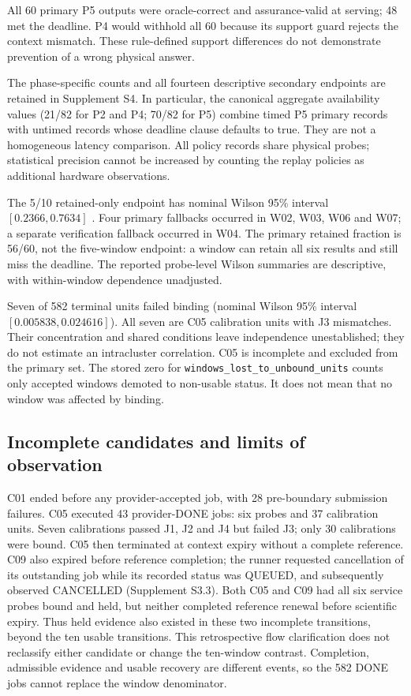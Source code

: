 \documentclass[pdflatex,sn-mathphys-num]{sn-jnl}
\newcommand{\code}[1]{\texttt{\small #1}}
\begin{document}
All 60 primary P5 outputs were oracle-correct and assurance-valid at serving; 48 met the deadline. P4 would withhold all 60 because its support guard rejects the context mismatch. These rule-defined support differences do not demonstrate prevention of a wrong physical answer.

The phase-specific counts and all fourteen descriptive secondary endpoints are retained in Supplement S4. In particular, the canonical aggregate availability values (21/82 for P2 and P4; 70/82 for P5) combine timed P5 primary records with untimed records whose deadline clause defaults to true. They are not a homogeneous latency comparison. All policy records share physical probes; statistical precision cannot be increased by counting the replay policies as additional hardware observations.

The 5/10 retained-only endpoint has nominal Wilson 95\% interval $[0.2366,0.7634]$ \cite{wilson1927}. Four primary fallbacks occurred in W02, W03, W06 and W07; a separate verification fallback occurred in W04. The primary retained fraction is 56/60, not the five-window endpoint: a window can retain all six results and still miss the deadline. The reported probe-level Wilson summaries are descriptive, with within-window dependence unadjusted.

Seven of 582 terminal units failed binding (nominal Wilson 95\% interval $[0.005838,0.024616]$). All seven are C05 calibration units with J3 mismatches. Their concentration and shared conditions leave independence unestablished; they do not estimate an intracluster correlation. C05 is incomplete and excluded from the primary set. The stored zero for \code{windows\_lost\_to\_unbound\_units} counts only accepted windows demoted to non-usable status. It does not mean that no window was affected by binding.

\subsection{Incomplete candidates and limits of observation}
C01 ended before any provider-accepted job, with 28 pre-boundary submission failures. C05 executed 43 provider-DONE jobs: six probes and 37 calibration units. Seven calibrations passed J1, J2 and J4 but failed J3; only 30 calibrations were bound. C05 then terminated at context expiry without a complete reference. C09 also expired before reference completion; the runner requested cancellation of its outstanding job while its recorded status was QUEUED, and subsequently observed CANCELLED (Supplement S3.3). Both C05 and C09 had all six service probes bound and held, but neither completed reference renewal before scientific expiry. Thus held evidence also existed in these two incomplete transitions, beyond the ten usable transitions. This retrospective flow clarification does not reclassify either candidate or change the ten-window contrast. Completion, admissible evidence and usable recovery are different events, so the 582 DONE jobs cannot replace the window denominator.
\end{document}
